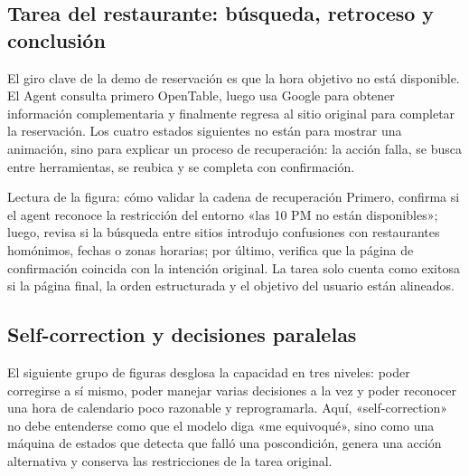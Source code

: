 \subsection{Tarea del restaurante: búsqueda, retroceso y conclusión}

El giro clave de la demo de reservación es que la hora objetivo no está disponible. El Agent consulta primero OpenTable, luego usa Google para obtener información complementaria y finalmente regresa al sitio original para completar la reservación. Los cuatro estados siguientes no están para mostrar una animación, sino para explicar un proceso de recuperación: la acción falla, se busca entre herramientas, se reubica y se completa con confirmación.






\begin{knowledgebox}{Lectura de la figura: cómo validar la cadena de recuperación}
Primero, confirma si el agent reconoce la restricción del entorno «las 10 PM no están disponibles»; luego, revisa si la búsqueda entre sitios introdujo confusiones con restaurantes homónimos, fechas o zonas horarias; por último, verifica que la página de confirmación coincida con la intención original. La tarea solo cuenta como exitosa si la página final, la orden estructurada y el objetivo del usuario están alineados.
\end{knowledgebox}

\subsection{Self-correction y decisiones paralelas}

El siguiente grupo de figuras desglosa la capacidad en tres niveles: poder corregirse a sí mismo, poder manejar varias decisiones a la vez y poder reconocer una hora de calendario poco razonable y reprogramarla. Aquí, «self-correction» no debe entenderse como que el modelo diga «me equivoqué», sino como una máquina de estados que detecta que falló una poscondición, genera una acción alternativa y conserva las restricciones de la tarea original.

